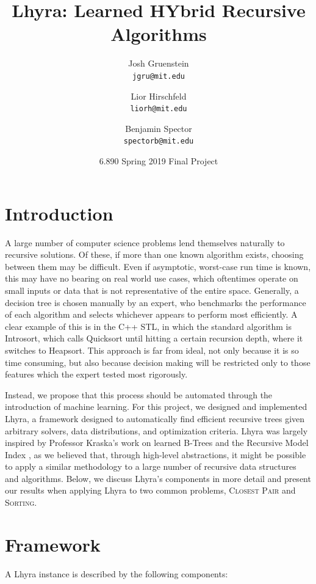 \documentclass[11pt]{article}
\title{Lhyra: Learned HYbrid Recursive Algorithms}
\author{
    Josh Gruenstein\\\texttt{jgru@mit.edu} \and Lior Hirschfeld\\\texttt{liorh@mit.edu} \and
    Benjamin Spector\\\texttt{spectorb@mit.edu}
}
\date{6.890 Spring 2019 Final Project}
\begin{document}
\maketitle

\section{Introduction}
A large number of computer science problems lend themselves naturally to recursive solutions. Of these, if more than one known algorithm exists, choosing between them may be difficult. Even if asymptotic, worst-case run time is known, this may have no bearing on real world use cases, which oftentimes operate on small inputs or data that is not representative of the entire space. Generally, a decision tree is chosen manually by an expert, who benchmarks the performance of each algorithm and selects whichever appears to perform most efficiently. A clear example of this is in the C++ STL, in which the standard algorithm is Introsort, which calls Quicksort until hitting a certain recursion depth, where it switches to Heapsort. This approach is far from ideal, not only because it is so time consuming, but also because decision making will be restricted only to those features which the expert tested most rigorously. 

Instead, we propose that this process should be automated through the introduction of machine learning. For this project, we designed and implemented Lhyra, a framework designed to automatically find efficient recursive trees given arbitrary solvers, data distributions, and optimization criteria. Lhyra was largely inspired by Professor Kraska's work on learned B-Trees and the Recursive Model Index \cite{kraska}, as we believed that, through high-level abstractions, it might be possible to apply a similar methodology to a large number of recursive data structures and algorithms. Below, we discuss Lhyra's components in more detail and present our results when applying Lhyra to two common problems, \textsc{Closest Pair} and \textsc{Sorting}.


\section{Framework}
A Lhyra instance is described by the following components:
\end{document}
